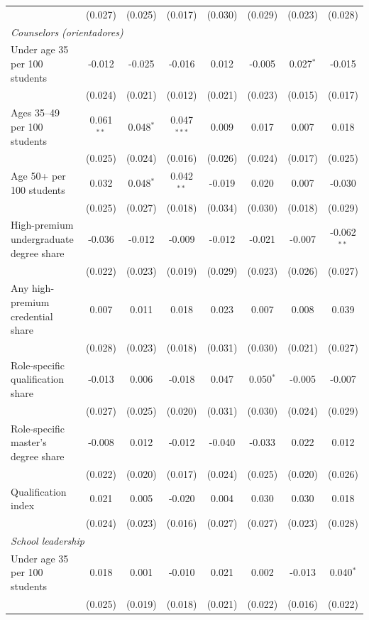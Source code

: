 \begin{table}[!htbp]
{\begin{tabular}{lccccccc}
 & (0.027) & (0.025) & (0.017) & (0.030) & (0.029) & (0.023) & (0.028) \\
\multicolumn{8}{l}{\textit{Counselors (orientadores)}} \\
\quad Under age 35 per 100 students & -0.012 & -0.025 & -0.016 & 0.012 & -0.005 & 0.027$^{*}$ & -0.015 \\
 & (0.024) & (0.021) & (0.012) & (0.021) & (0.023) & (0.015) & (0.017) \\
\quad Ages 35--49 per 100 students & 0.061$^{**}$ & 0.048$^{*}$ & 0.047$^{***}$ & 0.009 & 0.017 & 0.007 & 0.018 \\
 & (0.025) & (0.024) & (0.016) & (0.026) & (0.024) & (0.017) & (0.025) \\
\quad Age 50+ per 100 students & 0.032 & 0.048$^{*}$ & 0.042$^{**}$ & -0.019 & 0.020 & 0.007 & -0.030 \\
 & (0.025) & (0.027) & (0.018) & (0.034) & (0.030) & (0.018) & (0.029) \\
\quad High-premium undergraduate degree share & -0.036 & -0.012 & -0.009 & -0.012 & -0.021 & -0.007 & -0.062$^{**}$ \\
 & (0.022) & (0.023) & (0.019) & (0.029) & (0.023) & (0.026) & (0.027) \\
\quad Any high-premium credential share & 0.007 & 0.011 & 0.018 & 0.023 & 0.007 & 0.008 & 0.039 \\
 & (0.028) & (0.023) & (0.018) & (0.031) & (0.030) & (0.021) & (0.027) \\
\quad Role-specific qualification share & -0.013 & 0.006 & -0.018 & 0.047 & 0.050$^{*}$ & -0.005 & -0.007 \\
 & (0.027) & (0.025) & (0.020) & (0.031) & (0.030) & (0.024) & (0.029) \\
\quad Role-specific master's degree share & -0.008 & 0.012 & -0.012 & -0.040 & -0.033 & 0.022 & 0.012 \\
 & (0.022) & (0.020) & (0.017) & (0.024) & (0.025) & (0.020) & (0.026) \\
\quad Qualification index & 0.021 & 0.005 & -0.020 & 0.004 & 0.030 & 0.030 & 0.018 \\
 & (0.024) & (0.023) & (0.016) & (0.027) & (0.027) & (0.023) & (0.028) \\
\multicolumn{8}{l}{\textit{School leadership}} \\
\quad Under age 35 per 100 students & 0.018 & 0.001 & -0.010 & 0.021 & 0.002 & -0.013 & 0.040$^{*}$ \\
 & (0.025) & (0.019) & (0.018) & (0.021) & (0.022) & (0.016) & (0.022) \\

\end{tabular}}
\end{table}
